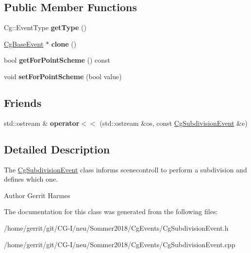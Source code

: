 \subsection*{Public Member Functions}
\begin{DoxyCompactItemize}
\item 
\mbox{\label{class_cg_subdivision_event_a76dab519a591b3d40331b7539a3f9cc7}} 
Cg\+::\+Event\+Type {\bfseries get\+Type} ()
\item 
\mbox{\label{class_cg_subdivision_event_a2754cb0450f311a5a25abeecc2c313fc}} 
\hyperlink{class_cg_base_event}{Cg\+Base\+Event} $\ast$ {\bfseries clone} ()
\item 
\mbox{\label{class_cg_subdivision_event_aebbc0ef37ed5e9ae1610d0b6d192b0ca}} 
bool {\bfseries get\+For\+Point\+Scheme} () const
\item 
\mbox{\label{class_cg_subdivision_event_ac6a39182e7ad76b67594786e3a60d089}} 
void {\bfseries set\+For\+Point\+Scheme} (bool value)
\end{DoxyCompactItemize}
\subsection*{Friends}
\begin{DoxyCompactItemize}
\item 
\mbox{\label{class_cg_subdivision_event_a0d9ed97543874c85f2bb55116204207c}} 
std\+::ostream \& {\bfseries operator$<$$<$} (std\+::ostream \&os, const \hyperlink{class_cg_subdivision_event}{Cg\+Subdivision\+Event} \&e)
\end{DoxyCompactItemize}


\subsection{Detailed Description}
The \hyperlink{class_cg_subdivision_event}{Cg\+Subdivision\+Event} class informs scenecontroll to perform a subdivision and defines which one. 

\begin{DoxyAuthor}{Author}
Gerrit Harmes 
\end{DoxyAuthor}


The documentation for this class was generated from the following files\+:\begin{DoxyCompactItemize}
\item 
/home/gerrit/git/\+C\+G-\/\+I/neu/\+Sommer2018/\+Cg\+Events/Cg\+Subdivision\+Event.\+h\item 
/home/gerrit/git/\+C\+G-\/\+I/neu/\+Sommer2018/\+Cg\+Events/Cg\+Subdivision\+Event.\+cpp\end{DoxyCompactItemize}

